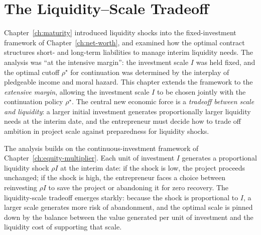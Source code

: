 \documentclass[11pt,a4paper,oneside]{book}
\theoremstyle{plain}
\theoremstyle{definition}
\theoremstyle{remark}
\numberwithin{equation}{chapter}
\begin{document}
\chapter{The Liquidity--Scale Tradeoff}
\label{ch:liquidity-scale}

Chapter~\ref{ch:maturity} introduced liquidity shocks into the fixed-investment framework of Chapter~\ref{ch:net-worth}, and examined how the optimal contract structures short- and long-term liabilities to manage interim liquidity needs.
The analysis was ``at the intensive margin'': the investment scale $I$ was held fixed, and the optimal cutoff $\rho^\star$ for continuation was determined by the interplay of pledgeable income and moral hazard.
This chapter extends the framework to the \emph{extensive margin}, allowing the investment scale $I$ to be chosen jointly with the continuation policy $\rho^\star$.
The central new economic force is a \emph{tradeoff between scale and liquidity}: a larger initial investment generates proportionally larger liquidity needs at the interim date, and the entrepreneur must decide how to trade off ambition in project scale against preparedness for liquidity shocks.

The analysis builds on the continuous-investment framework of Chapter~\ref{ch:equity-multiplier}.
Each unit of investment $I$ generates a proportional liquidity shock $\rho I$ at the interim date: if the shock is low, the project proceeds unchanged; if the shock is high, the entrepreneur faces a choice between reinvesting $\rho I$ to save the project or abandoning it for zero recovery.
The liquidity-scale tradeoff emerges starkly: because the shock is proportional to $I$, a larger scale generates more risk of abandonment, and the optimal scale is pinned down by the balance between the value generated per unit of investment and the liquidity cost of supporting that scale.
\end{document}
